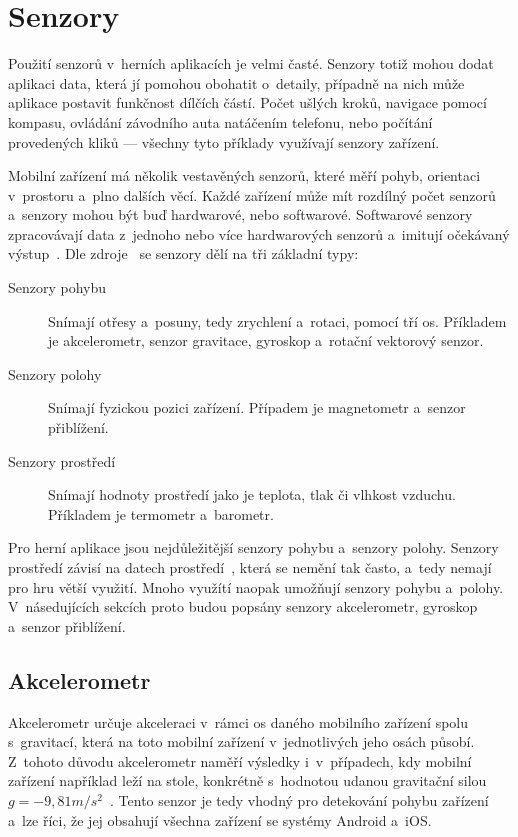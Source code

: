 \section{Senzory}

Použití senzorů v~herních aplikacích je velmi časté.
Senzory totiž mohou dodat aplikaci data,
která jí pomohou obohatit o~detaily,
případně na nich může aplikace postavit funkčnost dílčích částí.
Počet ušlých kroků,
navigace pomocí kompasu,
ovládání závodního auta natáčením telefonu,
nebo počítání provedených kliků
--- všechny tyto příklady využívají senzory zařízení.~\cite{sensors}

Mobilní zařízení má několik vestavěných senzorů,
které měří pohyb, orientaci v~prostoru a~plno dalších věcí.
Každé zařízení může mít rozdílný počet senzorů
a~senzory mohou být buď hardwarové, nebo softwarové.
Softwarové senzory zpracovávají data z~jednoho nebo více hardwarových senzorů
a~imitují očekávaný výstup~\cite{sensors}.
Dle zdroje~\cite{sensors} se senzory dělí na tři základní typy:

\begin{description}
    \item[Senzory pohybu] Snímají otřesy a~posuny,
    tedy zrychlení a~rotaci,
    pomocí tří os.
    Příkladem je akcelerometr, senzor gravitace, gyroskop
    a~rotační vektorový senzor.
    \item[Senzory polohy] Snímají fyzickou pozici zařízení.
    Případem je magnetometr a~senzor přiblížení.
    \item[Senzory prostředí] Snímají hodnoty prostředí
    jako je teplota, tlak či vlhkost vzduchu.
    Příkladem je termometr a~barometr.
\end{description}

Pro herní aplikace jsou nejdůležitější senzory pohybu a~senzory polohy.
Senzory prostředí závisí na datech prostředí~\cite{sensors_android},
která se nemění tak často,
a~tedy nemají pro hru větší využití.
Mnoho využítí naopak umožňují senzory pohybu a~polohy.
V~násedujících sekcích proto budou popsány senzory akcelerometr, gyroskop
a~senzor přiblížení.

\subsection{Akcelerometr}

Akcelerometr určuje akceleraci v~rámci os daného mobilního zařízení
spolu s~gravitací,
která na toto mobilní zařízení v~jednotlivých jeho osách
působí.
Z~tohoto důvodu akcelerometr naměří výsledky i~v~případech,
kdy mobilní zařízení například leží na stole,
konkrétně s~hodnotou udanou
gravitační silou $g = -9,81 m/s^2$~\cite{sensors_motion}.
Tento senzor je tedy vhodný pro detekování pohybu zařízení
a~lze říci,
že jej obsahují všechna zařízení se systémy Android a~iOS.

